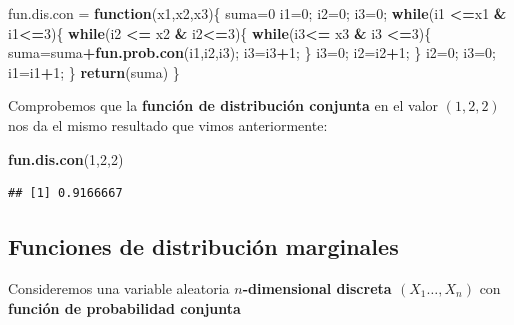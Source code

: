 \documentclass[]{book}
\newenvironment{Shaded}{\begin{snugshade}}{\end{snugshade}}
\newcommand{\ControlFlowTok}[1]{\textcolor[rgb]{0.13,0.29,0.53}{\textbf{#1}}}
\newcommand{\DecValTok}[1]{\textcolor[rgb]{0.00,0.00,0.81}{#1}}
\newcommand{\KeywordTok}[1]{\textcolor[rgb]{0.13,0.29,0.53}{\textbf{#1}}}
\newcommand{\NormalTok}[1]{#1}
\newcommand{\OperatorTok}[1]{\textcolor[rgb]{0.81,0.36,0.00}{\textbf{#1}}}
\newcommand{\StringTok}[1]{\textcolor[rgb]{0.31,0.60,0.02}{#1}}
\begin{document}
\begin{Shaded}
\begin{Highlighting}[]
\NormalTok{fun.dis.con =}\StringTok{ }\ControlFlowTok{function}\NormalTok{(x1,x2,x3)\{}
\NormalTok{  suma=}\DecValTok{0}
\NormalTok{  i1=}\DecValTok{0}\NormalTok{; i2=}\DecValTok{0}\NormalTok{; i3=}\DecValTok{0}\NormalTok{;}
  \ControlFlowTok{while}\NormalTok{(i1 }\OperatorTok{<=}\NormalTok{x1 }\OperatorTok{&}\StringTok{ }\NormalTok{i1}\OperatorTok{<=}\DecValTok{3}\NormalTok{)\{}
    \ControlFlowTok{while}\NormalTok{(i2 }\OperatorTok{<=}\StringTok{ }\NormalTok{x2 }\OperatorTok{&}\StringTok{ }\NormalTok{i2}\OperatorTok{<=}\DecValTok{3}\NormalTok{)\{}
      \ControlFlowTok{while}\NormalTok{(i3}\OperatorTok{<=}\StringTok{ }\NormalTok{x3 }\OperatorTok{&}\StringTok{ }\NormalTok{i3 }\OperatorTok{<=}\DecValTok{3}\NormalTok{)\{}
\NormalTok{        suma=suma}\OperatorTok{+}\KeywordTok{fun.prob.con}\NormalTok{(i1,i2,i3); i3=i3}\OperatorTok{+}\DecValTok{1}\NormalTok{;}
\NormalTok{      \}}
\NormalTok{      i3=}\DecValTok{0}\NormalTok{; i2=i2}\OperatorTok{+}\DecValTok{1}\NormalTok{;}
\NormalTok{    \}}
\NormalTok{    i2=}\DecValTok{0}\NormalTok{; i3=}\DecValTok{0}\NormalTok{; i1=i1}\OperatorTok{+}\DecValTok{1}\NormalTok{;}
\NormalTok{  \}}
  \KeywordTok{return}\NormalTok{(suma)}
\NormalTok{\}}
\end{Highlighting}
\end{Shaded}

Comprobemos que la \textbf{función de distribución conjunta} en el valor \((1,2,2)\) nos da el mismo resultado que vimos anteriormente:

\begin{Shaded}
\begin{Highlighting}[]
\KeywordTok{fun.dis.con}\NormalTok{(}\DecValTok{1}\NormalTok{,}\DecValTok{2}\NormalTok{,}\DecValTok{2}\NormalTok{)}
\end{Highlighting}
\end{Shaded}

\begin{verbatim}
## [1] 0.9166667
\end{verbatim}

\hypertarget{funciones-de-distribuciuxf3n-marginales}{%
\subsection{Funciones de distribución marginales}\label{funciones-de-distribuciuxf3n-marginales}}

Consideremos una variable aleatoria \textbf{\(n\)-dimensional discreta \((X_1\ldots,X_n)\)} con \textbf{función de probabilidad conjunta}
\end{document}
